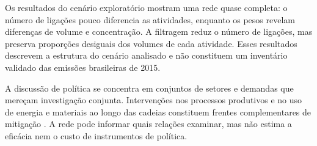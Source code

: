 Os resultados do cenário exploratório mostram uma rede quase completa: o número de ligações pouco diferencia as atividades, enquanto os pesos revelam diferenças de volume e concentração. A filtragem reduz o número de ligações, mas preserva proporções desiguais dos volumes de cada atividade. Esses resultados descrevem a estrutura do cenário analisado e não constituem um inventário validado das emissões brasileiras de 2015.

A discussão de política se concentra em conjuntos de setores e demandas que mereçam investigação conjunta. Intervenções nos processos produtivos e no uso de energia e materiais ao longo das cadeias constituem frentes complementares de mitigação \parencite{rissman2020}. A rede pode informar quais relações examinar, mas não estima a eficácia nem o custo de instrumentos de política.
